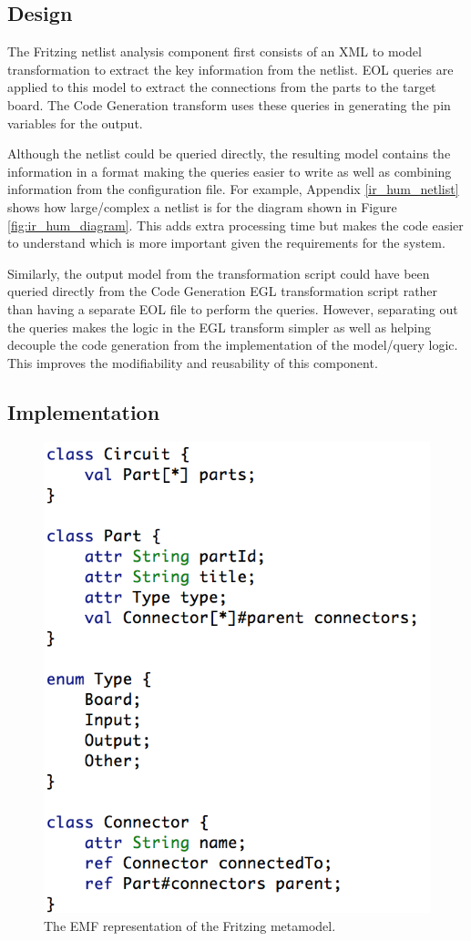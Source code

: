 \documentclass{UoYCSproject}
\begin{document}
\subsection{Design}
The Fritzing netlist analysis component first consists of an XML to model transformation to extract the key information from the netlist. EOL queries are applied to this model to extract the connections from the parts to the target board. The Code Generation transform uses these queries in generating the pin variables for the output.

Although the netlist could be queried directly, the resulting model contains the information in a format making the queries easier to write as well as combining information from the configuration file. For example, Appendix \ref{ir_hum_netlist} shows how large/complex a netlist is for the diagram shown in Figure \ref{fig:ir_hum_diagram}. This adds extra processing time but makes the code easier to understand which is more important given the requirements for the system.

Similarly, the output model from the transformation script could have been queried directly from the Code Generation EGL transformation script rather than having a separate EOL file to perform the queries. However, separating out the queries makes the logic in the EGL transform simpler as well as helping decouple the code generation from the implementation of the model/query logic. This improves the modifiability and reusability of this component.

\subsection{Implementation}

\begin{figure}[h!]
  \centering
  \includegraphics[width=0.4\linewidth]{graphics/fritz_metamodel.png}
  \caption{The EMF representation of the Fritzing metamodel.}
  \label{fig:fritz_metamodel}
\end{figure}
\end{document}
